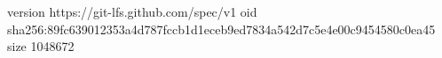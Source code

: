 version https://git-lfs.github.com/spec/v1
oid sha256:89fc639012353a4d787fccb1d1eceb9ed7834a542d7c5e4e00c9454580c0ea45
size 1048672
